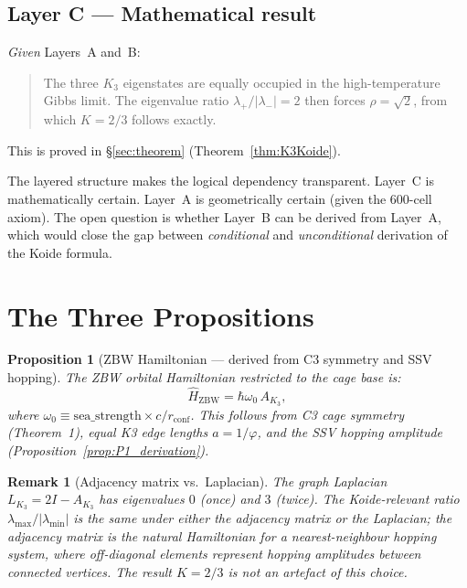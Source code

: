 \documentclass[11pt]{article}
\newtheorem{remark}{Remark}[section]
\newtheorem{proposition}[theorem]{Proposition}
\newcommand{\ZBW}{\mathrm{ZBW}}
\begin{document}
\subsection{Layer C --- Mathematical result}

\emph{Given} Layers~A and~B:
\begin{quote}
The three $K_3$ eigenstates are equally occupied in the
high-temperature Gibbs limit.  The eigenvalue ratio
$\lambda_+/|\lambda_-| = 2$ then forces $\rho = \sqrt{2}$,
from which $K = 2/3$ follows exactly.
\end{quote}
This is proved in \S\ref{sec:theorem} (Theorem~\ref{thm:K3Koide}).

\medskip

The layered structure makes the logical dependency transparent.
Layer~C is mathematically certain.  Layer~A is geometrically
certain (given the 600-cell axiom).  The open question is whether
Layer~B can be derived from Layer~A, which would close the gap
between \emph{conditional} and \emph{unconditional} derivation
of the Koide formula.

\section{The Three Propositions}

\begin{proposition}[$\ZBW$ Hamiltonian --- derived from C3 symmetry and SSV hopping]
\label{post:H}
The ZBW orbital Hamiltonian restricted to the cage base is:
\[
\hat{H}_{\ZBW} = \hbar\omega_0\, A_{K_3},
\]
where $\omega_0 \equiv \mathrm{sea\_strength}\times c/r_{\mathrm{conf}}$.
This follows from C3 cage symmetry (Theorem~1), equal K3 edge lengths
$a = 1/\varphi$, and the SSV hopping amplitude
(Proposition~\ref{prop:P1_derivation}).
\end{proposition}

\begin{remark}[Adjacency matrix vs.\ Laplacian]
The graph Laplacian $L_{K_3} = 2I - A_{K_3}$ has eigenvalues $0$ (once)
and $3$ (twice).  The Koide-relevant ratio $\lambda_{\max}/|\lambda_{\min}|$
is the same under either the adjacency matrix or the Laplacian; the
adjacency matrix is the natural Hamiltonian for a nearest-neighbour hopping
system, where off-diagonal elements represent hopping amplitudes between
connected vertices.  The result $K = 2/3$ is not an artefact of this choice.
\end{remark}
\end{document}
